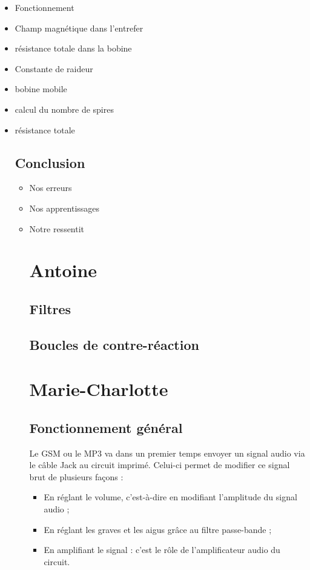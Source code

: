 \documentclass{article}
\begin{document}
\begin{itemize}
    \item Fonctionnement
    \item Champ magnétique dans l'entrefer
    \item résistance totale dans la bobine
    \item Constante de raideur
    \item bobine mobile
    \item calcul du nombre de spires
    \item résistance totale
\subsection{Conclusion}
\begin{itemize}
    \item Nos erreurs
    \item Nos apprentissages
    \item Notre ressentit
\section{Antoine}
\subsection{Filtres}

\subsection{Boucles de contre-réaction}

\section{Marie-Charlotte}
\subsection{Fonctionnement général}

Le GSM ou le MP3 va dans un premier temps envoyer un signal audio via le câble Jack au circuit imprimé. Celui-ci permet
de modifier ce signal brut de plusieurs façons :

\begin{itemize}
	\item En réglant le volume, c'est-à-dire en modifiant l'amplitude du signal audio ;
	\item En réglant les graves et les aigus grâce au filtre passe-bande ;
	\item En amplifiant le signal : c'est le rôle de l'amplificateur audio du circuit.
\end{itemize}


\end{itemize}
\end{itemize}
\end{document}
